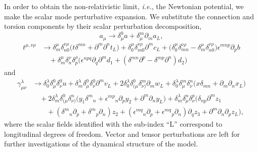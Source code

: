 \documentclass{ws-mpla}
\renewcommand{\(}{\left(}
\renewcommand{\)}{\right)}
\renewcommand{\[}{\left[}
\renewcommand{\]}{\right]}
\begin{document}
In order to obtain the non-relativistic limit, \emph{i.e.}, the Newtonian potential, we make the scalar mode perturbative expansion. We substitute the connection and torsion components by their scalar perturbation decomposition,
\begin{equation}
  a_\mu \to \delta_\mu^0 a+\delta_\mu^m \partial_{m}a_L,
\end{equation}
\begin{equation}
  \begin{split}
    t^{\mu,\nu\rho} &\to \delta^{\mu}_m\delta^{\nu\rho}_{n0} \Big(t \delta^{m n} + \partial^m \partial^n t_L \Big)
    +\delta^{\mu}_0 \delta^{\nu\rho}_{m0} \partial^m c_L
    + \Big(\delta^{\mu}_0\delta^{\nu\rho}_{mn}-\delta^{\mu}_m\delta^{\nu\rho}_{n0}\Big)\epsilon^{m n p} \partial_{p} b
    \\
    & \quad +\delta^{\mu}_m \delta^{\nu}_{n} \delta^{\rho}_{p} \Big(\epsilon^{n p q}\partial_q \partial^m d_1 +  (\delta^{m n} \partial^p - \delta^{m p} \partial^n)d_2\Big)
  \end{split}
\end{equation}
and
\begin{equation}
  \begin{split}
    \gamma^\lambda_{\mu\nu}
    &\to
    \delta^\lambda_0\delta^0_\mu\delta^0_\nu u 
    + \delta^\lambda_m \delta^0_\mu\delta^0_\nu \partial^m v_L
    + 2\delta^\lambda_0 \delta^0_{(\mu}\delta^m_{\nu)} \partial_m w_L+ \delta^\lambda_0 \delta^m_\mu\delta^n_\nu \Big(x \delta_{mn} + \partial_m \partial_n x_L\Big)
    \\
    & \quad + 2\delta^\lambda_m \delta^0_{(\mu}\delta^n_{\nu)} \Big(y_1 \delta^m{}_n + \epsilon^{m p}{}_{n} \partial_p y_2 + \partial^m \partial_n y_L\Big)
    + \delta^\lambda_m \delta^n_{\mu}\delta^p_{\nu} \Big(\delta_{n p} \partial^m z_1
    \\
    & \qquad + (\delta^m{}_n \partial_p+\delta^m{}_p \partial_n) z_2 +  (\epsilon^{m q}{}_n \partial_p+\epsilon^{m q}{}_p \partial_n) \partial_q z_3 + \partial^m \partial_n \partial_p z_L\Big),
  \end{split}
\end{equation}
where the scalar fields identified with the sub-index ``L'' correspond to longitudinal degrees of freedom. Vector and tensor perturbations are left for further investigations of the dynamical structure of the model.
\end{document}
